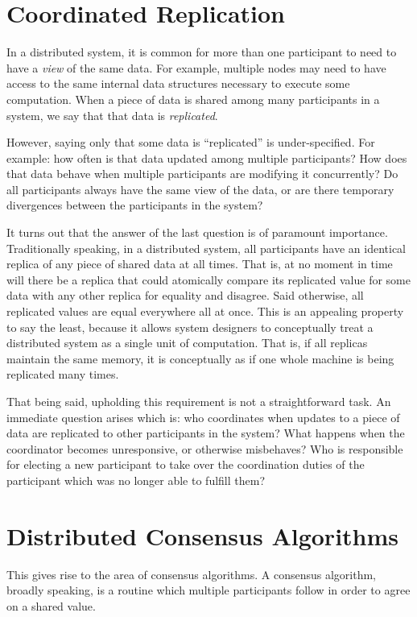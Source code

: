 \section{Coordinated Replication}
In a distributed system, it is common for more than one participant to need to
have a \textit{view} of the same data. For example, multiple nodes may need to
have access to the same internal data structures necessary to execute some
computation. When a piece of data is shared among many participants in a system,
we say that that data is \textit{replicated}.

However, saying only that some data is ``replicated'' is under-specified. For
example: how often is that data updated among multiple participants? How does
that data behave when multiple participants are modifying it concurrently? Do
all participants always have the same view of the data, or are there temporary
divergences between the participants in the system?

It turns out that the answer of the last question is of paramount importance.
Traditionally speaking, in a distributed system, all participants have an
identical replica of any piece of shared data at all times. That is, at no
moment in time will there be a replica that could atomically compare its
replicated value for some data with any other replica for equality and disagree.
Said otherwise, all replicated values are equal everywhere all at once. This is
an appealing property to say the least, because it allows system designers to
conceptually treat a distributed system as a single unit of computation. That
is, if all replicas maintain the same memory, it is conceptually as if one whole
machine is being replicated many times.

That being said, upholding this requirement is not a straightforward task. An
immediate question arises which is: who coordinates when updates to a piece of
data are replicated to other participants in the system? What happens when the
coordinator becomes unresponsive, or otherwise misbehaves? Who is responsible
for electing a new participant to take over the coordination duties of the
participant which was no longer able to fulfill them?

\section{Distributed Consensus Algorithms}

This gives rise to the area of consensus algorithms. A consensus algorithm,
broadly speaking, is a routine which multiple participants follow in order to
agree on a shared value.

